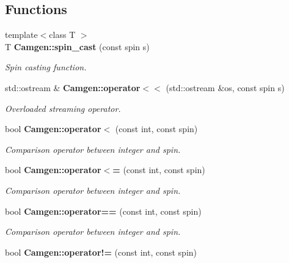 \subsection*{Functions}
\begin{DoxyCompactItemize}
\item 
\hypertarget{a00849_ad7ab434e0e492da345671a1f3500ae0a}{{\footnotesize template$<$class T $>$ }\\T {\bfseries Camgen\-::spin\-\_\-cast} (const spin s)}\label{a00849_ad7ab434e0e492da345671a1f3500ae0a}

\begin{DoxyCompactList}\small\item\em Spin casting function. \end{DoxyCompactList}\item 
\hypertarget{a00849_a169990e0965b02e882b8d1fd528e38b8}{std\-::ostream \& {\bfseries Camgen\-::operator$<$$<$} (std\-::ostream \&os, const spin s)}\label{a00849_a169990e0965b02e882b8d1fd528e38b8}

\begin{DoxyCompactList}\small\item\em Overloaded streaming operator. \end{DoxyCompactList}\item 
\hypertarget{a00849_aedf2ac662128e6751448790f17804b27}{bool {\bfseries Camgen\-::operator$<$} (const int, const spin)}\label{a00849_aedf2ac662128e6751448790f17804b27}

\begin{DoxyCompactList}\small\item\em Comparison operator between integer and spin. \end{DoxyCompactList}\item 
\hypertarget{a00849_a39c564b592e32b0afb9194a44c51502f}{bool {\bfseries Camgen\-::operator$<$=} (const int, const spin)}\label{a00849_a39c564b592e32b0afb9194a44c51502f}

\begin{DoxyCompactList}\small\item\em Comparison operator between integer and spin. \end{DoxyCompactList}\item 
\hypertarget{a00849_a1a6a8e89789fe39a53887905bacbdc0f}{bool {\bfseries Camgen\-::operator==} (const int, const spin)}\label{a00849_a1a6a8e89789fe39a53887905bacbdc0f}

\begin{DoxyCompactList}\small\item\em Comparison operator between integer and spin. \end{DoxyCompactList}\item 
\hypertarget{a00849_a5628b75a61029b430b8acd8deebf7a2c}{bool {\bfseries Camgen\-::operator!=} (const int, const spin)}\label{a00849_a5628b75a61029b430b8acd8deebf7a2c}


\end{DoxyCompactItemize}

